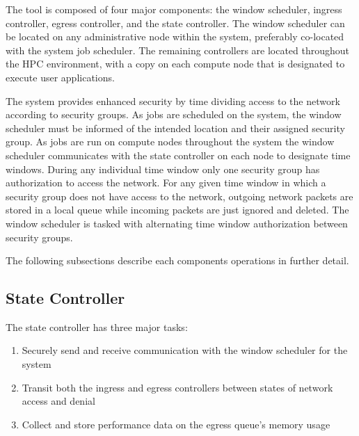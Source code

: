 \documentclass[oneside,12pt]{memoir}
\begin{document}
The tool is composed of four major components:  the window scheduler, ingress controller, egress controller, and the state controller. The window scheduler can be located on any administrative node within the system, preferably co-located with the system job scheduler. The remaining controllers are located throughout the HPC environment, with a copy on each compute node that is designated to execute user applications. 

The system provides enhanced security by time dividing access to the network according to security groups. As jobs are scheduled on the system, the window scheduler must be informed of the intended location and their assigned security group. As jobs are run on compute nodes throughout the system the window scheduler communicates with the state controller on each node to designate time windows. During any individual time window only one security group has authorization to access the network. For any given time window in which a security group does not have access to the network, outgoing network packets are stored in a local queue while incoming packets are just ignored and deleted. The window scheduler is tasked with alternating time window authorization between security groups.

The following subsections describe each components operations in further detail. 
\subsection{State Controller}
The state controller has three major tasks:
\begin{enumerate} \itemsep1pt \parskip0pt 
\item Securely send and receive communication with the window scheduler for the system
\item Transit both the ingress and egress controllers between states of network access and denial
\item Collect and store performance data on the egress queue's memory usage
\end{enumerate}
\end{document}
